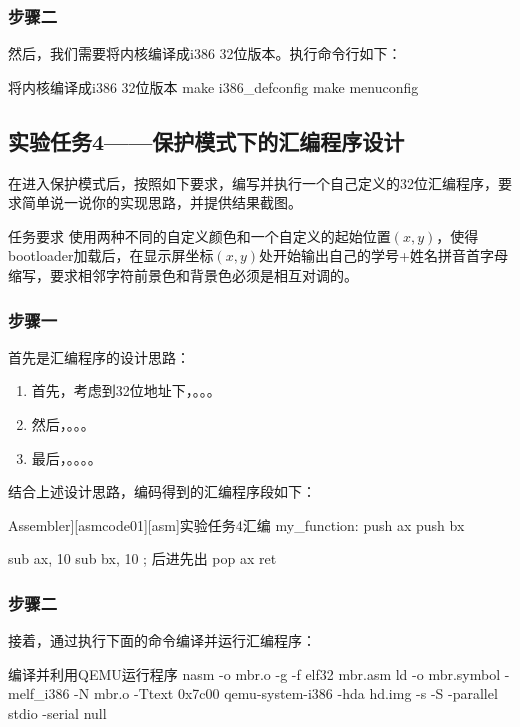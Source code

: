 \documentclass{sysucseexp}
\begin{document}
\subsubsection{步骤二}
然后，我们需要将内核编译成i386 32位版本。执行命令行如下：
\begin{ubtdark}{将内核编译成i386 32位版本}
  make i386_defconfig
  make menuconfig
\end{ubtdark}

\subsection{实验任务4——保护模式下的汇编程序设计}
在进入保护模式后，按照如下要求，编写并执行一个自己定义的32位汇编程序，要求简单说一说你的实现思路，并提供结果截图。
\begin{titledBox}{任务要求}
  使用两种不同的自定义颜色和一个自定义的起始位置$(x,y)$，使得bootloader加载后，在显示屏坐标$(x,y)$处开始输出自己的学号+姓名拼音首字母缩写，要求相邻字符前景色和背景色必须是相互对调的。
\end{titledBox}
\subsubsection{步骤一}
首先是汇编程序的设计思路：
\begin{enumerate}
  \item 首先，考虑到32位地址下，。。。
  \item 然后，。。。
  \item 最后，。。。。
\end{enumerate}
结合上述设计思路，编码得到的汇编程序段如下：
\begin{center}
  \begin{langCVOne}[[x86masm]Assembler][asmcode01][asm]{实验任务4汇编}
    my_function:
    push ax
    push bx
    
    sub ax, 10
    sub bx, 10
    ; 后进先出
    pop ax
    ret
  \end{langCVOne}
  \end{center}
\subsubsection{步骤二}
接着，通过执行下面的命令编译并运行汇编程序：
\begin{ubtdark}{编译并利用QEMU运行程序}
  nasm -o mbr.o -g -f elf32 mbr.asm 
  ld -o mbr.symbol -melf_i386 -N mbr.o -Ttext 0x7c00
  qemu-system-i386 -hda hd.img -s -S -parallel stdio -serial null
\end{ubtdark}
\end{document}
